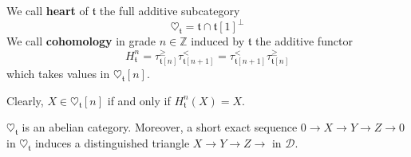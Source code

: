 \begin{defn}
We call \textbf{heart} of $\mathfrak{t}$ the full additive subcategory $$\heartsuit_{\mathfrak{t}}=\mathfrak{t}\cap \mathfrak{t}[1]^{\perp}$$
We call \textbf{cohomology} in grade $n \in \mathbb{Z}$ induced by $\mathfrak{t}$ the additive functor $$H^n_{\mathfrak{t}}=\tau^{\ge}_{\mathfrak{t}[n]} \tau^<_{\mathfrak{t}[n+1]}=\tau^<_{\mathfrak{t}[n+1]}\tau^{\ge}_{\mathfrak{t}[n]}$$ 
which takes values in $\heartsuit_{\mathfrak{t}}[n]$. \\
\end{defn}
%
%
%
Clearly, $X \in \heartsuit_{\mathfrak{t}}[n]$ if and only if $H^n_{\mathfrak{t}}(X)=X$. \\

\begin{prop}\label{o}
$\heartsuit_{\mathfrak{t}}$ is an abelian category. Moreover, a short exact sequence $0 \longrightarrow X \longrightarrow Y \longrightarrow Z \longrightarrow 0$ in $\heartsuit_{\mathfrak{t}}$ induces a distinguished triangle $X \longrightarrow Y \longrightarrow Z \longrightarrow $ in $\mathscr{D}$. 
\end{prop}

